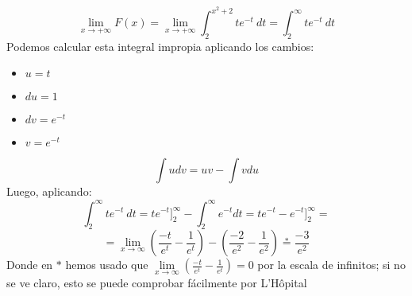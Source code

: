 \documentclass[12pt]{article}
\begin{document}
\begin{ejercicio}
\begin{enumerate}[label=\alph*)]
            $$\lim\limits_{x\to+\infty} F(x) = \lim\limits_{x\to+\infty} \int_{2}^{x^2+2} te^{-t}~dt = \int_{2}^{\infty} te^{-t}~dt$$
            Podemos calcular esta integral impropia aplicando los cambios:
            \begin{itemize}
                \item $u=t$
                \item $du=1$
                \item $dv=e^{-t}$
                \item $v=e^{-t}$
            \end{itemize}
            $$\int udv = uv-\int vdu$$
            Luego, aplicando:
            $$\int_{2}^{\infty} te^{-t}~dt = te^{-t}]_2^\infty - \int_{2}^{\infty} e^{-t}dt =te^{-t}-e^{-t}]_2^\infty =$$
            $$=\lim\limits_{x\to\infty}(\frac{-t}{e^t}-\frac1{e^t})-(\frac{-2}{e^2}-\frac1{e^2}) \overset*=\boxed{\frac{-3}{e^2}}$$
            Donde en $*$ hemos usado que $\lim\limits_{x\to\infty}(\frac{-t}{e^t}-\frac1{e^t}) = 0$ por la escala de infinitos; si no se ve claro, esto se puede comprobar fácilmente por L'Hôpital 
            \newline\newline

            \centering\fbox{En conclusión $img(F) = [0,+\infty[$}
                        
        \end{enumerate}
    \end{ejercicio}

    
\end{document}
